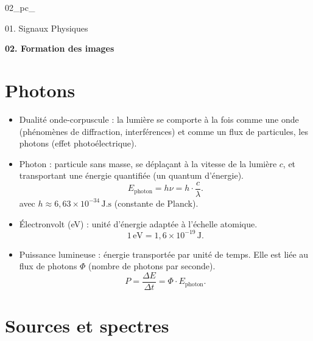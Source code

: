 \documentclass[a4paper,12pt]{article}
\newcommand{\repere}{%
  02\_pc\_%
  \twodigit{\month}%
  \twodigit{\day}%
  \twodigit{\currenthour}%
  \twodigit{\currentminute}%
}
\begin{document}
\noindent
\begin{minipage}[t]{0.15\textwidth}
    \small \repere
\end{minipage}%
\begin{minipage}[t]{0.7\textwidth}
    \centering
    \small 01. Signaux Physiques
\end{minipage}

\vspace{-0.2cm}
\noindent
\centering
{\large \textbf{02. Formation des images}}

\vspace{0.5cm}


\section{Photons}

\begin{itemize}
    \item Dualité onde-corpuscule : la lumière se comporte à la fois comme une onde (phénomènes de diffraction, interférences) et comme un flux de particules, les photons (effet photoélectrique).

    \item Photon : particule sans masse, se déplaçant à la vitesse de la lumière $c$, et transportant une énergie quantifiée (un quantum d'énergie).
    \[ E_{\text{photon}} = h \nu = h \cdot \frac{c}{\lambda}. \]
    avec $h \approx 6,63 \times 10^{-34}\,\text{J.s}$ (constante de Planck).
    
    \item Électronvolt (eV) : unité d'énergie adaptée à l'échelle atomique.
    \[ 1\,\text{eV} = 1,6 \times 10^{-19}\,\text{J}. \]

    \item Puissance lumineuse : énergie transportée par unité de temps. Elle est liée au flux de photons $\Phi$ (nombre de photons par seconde).
    \[ P = \frac{\Delta E}{\Delta t} = \Phi \cdot E_{\text{photon}}. \]
\end{itemize}


\section{Sources et spectres}
\end{document}
